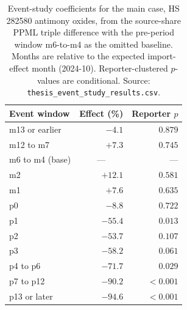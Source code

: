 \begin{table}[H]
\centering
\caption{Event-study coefficients for the main case, HS 282580 antimony oxides,
from the source-share PPML triple difference with the pre-period window
m6-to-m4 as the omitted baseline. Months are relative to the expected
import-effect month (2024-10). Reporter-clustered $p$-values are conditional.
Source: \texttt{thesis\_event\_study\_results.csv}.}
\label{tab:eventstudy}
\footnotesize
\begin{tabular}{lrr}
\toprule
Event window & Effect (\%) & Reporter $p$ \\
\midrule
m13 or earlier   & $-4.1$  & $0.879$ \\
m12 to m7        & $+7.3$  & $0.745$ \\
m6 to m4 (base)  & \multicolumn{1}{c}{---} & --- \\
m2               & $+12.1$ & $0.581$ \\
m1               & $+7.6$  & $0.635$ \\
p0               & $-8.8$  & $0.722$ \\
p1               & $-55.4$ & $0.013$ \\
p2               & $-53.7$ & $0.107$ \\
p3               & $-58.2$ & $0.061$ \\
p4 to p6         & $-71.7$ & $0.029$ \\
p7 to p12        & $-90.2$ & $<0.001$ \\
p13 or later     & $-94.6$ & $<0.001$ \\
\bottomrule
\end{tabular}
\end{table}
